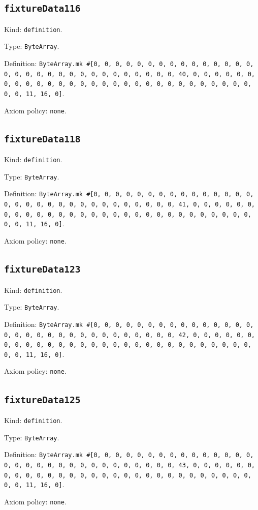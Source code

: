\documentclass[11pt]{article}
\begin{document}
\subsection*{\texttt{fixtureData116}}
\noindent Kind: \texttt{definition}.\par
\noindent Type: \texttt{ByteArray}.\par
\noindent Definition: \texttt{ByteArray.mk \#[0, 0, 0, 0, 0, 0, 0, 0, 0, 0, 0, 0, 0, 0, 0, 0, 0, 0, 0, 0, 0, 0, 0, 0, 0, 0, 0, 0, 0, 0, 0, 40, 0, 0, 0, 0, 0, 0, 0, 0, 0, 0, 0, 0, 0, 0, 0, 0, 0, 0, 0, 0, 0, 0, 0, 0, 0, 0, 0, 0, 0, 0, 0, 11, 16, 0]}.\par
\noindent Axiom policy: \texttt{none}.\par
\subsection*{\texttt{fixtureData118}}
\noindent Kind: \texttt{definition}.\par
\noindent Type: \texttt{ByteArray}.\par
\noindent Definition: \texttt{ByteArray.mk \#[0, 0, 0, 0, 0, 0, 0, 0, 0, 0, 0, 0, 0, 0, 0, 0, 0, 0, 0, 0, 0, 0, 0, 0, 0, 0, 0, 0, 0, 0, 0, 41, 0, 0, 0, 0, 0, 0, 0, 0, 0, 0, 0, 0, 0, 0, 0, 0, 0, 0, 0, 0, 0, 0, 0, 0, 0, 0, 0, 0, 0, 0, 0, 11, 16, 0]}.\par
\noindent Axiom policy: \texttt{none}.\par
\subsection*{\texttt{fixtureData123}}
\noindent Kind: \texttt{definition}.\par
\noindent Type: \texttt{ByteArray}.\par
\noindent Definition: \texttt{ByteArray.mk \#[0, 0, 0, 0, 0, 0, 0, 0, 0, 0, 0, 0, 0, 0, 0, 0, 0, 0, 0, 0, 0, 0, 0, 0, 0, 0, 0, 0, 0, 0, 0, 42, 0, 0, 0, 0, 0, 0, 0, 0, 0, 0, 0, 0, 0, 0, 0, 0, 0, 0, 0, 0, 0, 0, 0, 0, 0, 0, 0, 0, 0, 0, 0, 11, 16, 0]}.\par
\noindent Axiom policy: \texttt{none}.\par
\subsection*{\texttt{fixtureData125}}
\noindent Kind: \texttt{definition}.\par
\noindent Type: \texttt{ByteArray}.\par
\noindent Definition: \texttt{ByteArray.mk \#[0, 0, 0, 0, 0, 0, 0, 0, 0, 0, 0, 0, 0, 0, 0, 0, 0, 0, 0, 0, 0, 0, 0, 0, 0, 0, 0, 0, 0, 0, 0, 43, 0, 0, 0, 0, 0, 0, 0, 0, 0, 0, 0, 0, 0, 0, 0, 0, 0, 0, 0, 0, 0, 0, 0, 0, 0, 0, 0, 0, 0, 0, 0, 11, 16, 0]}.\par
\noindent Axiom policy: \texttt{none}.\par
\end{document}
